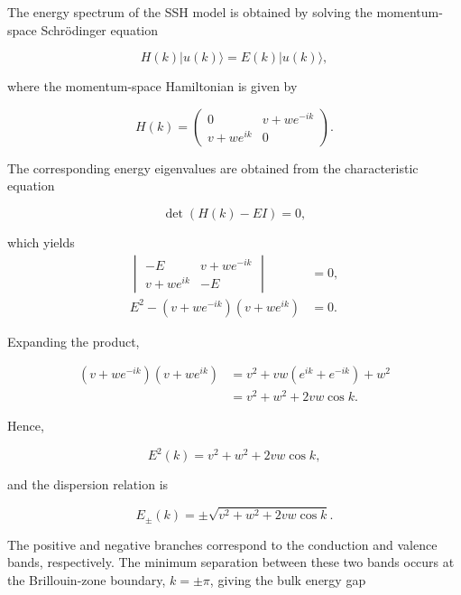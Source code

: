 \documentclass[11pt, a4paper]{article}
\begin{document}
The energy spectrum of the SSH model is obtained by solving the momentum-space Schrödinger equation

\begin{equation}
H(k)|u(k)\rangle = E(k)|u(k)\rangle,
\end{equation}

where the momentum-space Hamiltonian is given by

\begin{equation}
H(k)=
\begin{pmatrix}
0 & v+we^{-ik}\\
v+we^{ik} & 0
\end{pmatrix}.
\end{equation}

The corresponding energy eigenvalues are obtained from the characteristic equation

\begin{equation}
\det\left(H(k)-EI\right)=0,
\end{equation}

which yields
\begin{align*}
\begin{vmatrix}
-E & v+we^{-ik}\\
v+we^{ik} & -E
\end{vmatrix}
&=0,\\
E^2-\left(v+we^{-ik}\right)\left(v+we^{ik}\right)&=0.
\end{align*}

Expanding the product,

\begin{align*}
\left(v+we^{-ik}\right)\left(v+we^{ik}\right)
&=
v^2
+
vw\left(e^{ik}+e^{-ik}\right)
+
w^2\\
&=
v^2+w^2+2vw\cos k.
\end{align*}

Hence,

\begin{equation}
E^2(k)=v^2+w^2+2vw\cos k,
\end{equation}

and the dispersion relation is

\begin{equation}
E_{\pm}(k)=
\pm
\sqrt{v^2+w^2+2vw\cos k}.
\label{eq:dispersion_relation}
\end{equation}

The positive and negative branches correspond to the conduction and valence bands, respectively.
The minimum separation between these two bands occurs at the Brillouin-zone boundary, $k=\pm\pi$, giving the bulk energy gap
\end{document}
